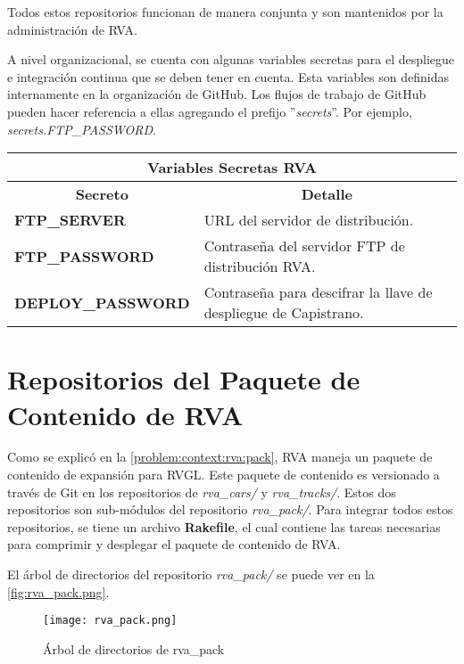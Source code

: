 Todos estos repositorios funcionan de manera conjunta y son mantenidos por la administración de RVA.

A nivel organizacional, se cuenta con algunas variables secretas para el despliegue e integración continua que se deben tener en cuenta. Esta variables son definidas internamente en la organización de GitHub. Los flujos de trabajo de GitHub pueden hacer referencia a ellas agregando el prefijo ''\textit{secrets}''. Por ejemplo, \textit{secrets.FTP\_PASSWORD}.

\begin{center}
  \begin{tabular}{ | p{5cm} | p{10cm}| }
    \hline
    \multicolumn{2}{|c|}{\textbf{Variables Secretas RVA}} \\
    \hline
    \multicolumn{1}{|c|}{\textbf{Secreto}} & \multicolumn{1}{|c|}{\textbf{Detalle}} \\
    \hline
    {\textbf{FTP\_SERVER}} & URL del servidor de distribución. \\ \hline
    
    {\textbf{FTP\_PASSWORD}} & Contraseña del servidor FTP de distribución RVA. \\ \hline
    
    {\textbf{DEPLOY\_PASSWORD}} & Contraseña para descifrar la llave de despliegue de Capistrano. \\
    
    \hline
  \end{tabular}
\end{center}

\newpage

\section{Repositorios del Paquete de Contenido de RVA}
Como se explicó en la \autoref{problem:context:rva:pack}, RVA maneja un paquete de contenido de expansión para RVGL. Este paquete de contenido es versionado a través de Git en los repositorios de \textit{rva\_cars/} y \textit{rva\_tracks/}. Estos dos repositorios son sub-módulos del repositorio \textit{rva\_pack/}. Para integrar todos estos repositorios, se tiene un archivo \textbf{Rakefile}, el cual contiene las tareas necesarias para comprimir y desplegar el paquete de contenido de RVA.

El árbol de directorios del repositorio \textit{rva\_pack/} se puede ver en la \autoref{fig:rva_pack.png}.

\begin{figure}[H]
  \begin{center}
    \texttt{[image: rva\_pack.png]}
  \end{center}
  \caption[Árbol de directorios de rva\_pack]{Árbol de directorios de rva\_pack}
  \label{fig:rva_pack.png}
\end{figure}

